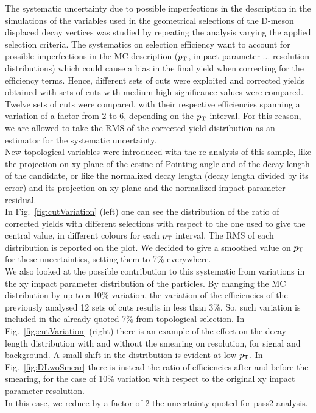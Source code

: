 The systematic uncertainty due to possible imperfections
 in the description in the simulations
of the variables used in the geometrical selections of the 
D-meson displaced decay vertices was
studied by repeating the analysis varying the applied selection criteria.
The systematics on selection efficiency want to account for 
possible imperfections in the MC description ($p_{\rm T}$, 
impact parameter ... resolution distributions) which could 
cause a bias in the final yield when correcting for the efficiency terms.
Hence, different sets of cuts were exploited and corrected 
yields obtained with sets of cuts with medium-high significance 
values were compared. Twelve sets of cuts were compared, 
with their respective efficiencies spanning a variation of
a factor from 2 to 6, depending on the $p_{\rm T}$ interval. For this 
reason, we are allowed to take the RMS of the corrected yield distribution as 
an estimator for the systematic uncertainty. \\New topological 
variables were introduced with the re-analysis of this
sample, like the projection on xy plane of the cosine of Pointing 
angle and of the decay length of the candidate, or like
the normalized decay length (decay length divided by its error) 
and its projection on xy plane and the normalized impact parameter
residual. \\In Fig.~\ref{fig:cutVariation} (left) one can see the 
distribution of the ratio of corrected yields with different selections with respect to the one
used to give the central value, in different colours for each 
$p_{\rm T}$ interval. The RMS of each distribution is reported on the plot. 
We decided to give a smoothed value on $p_{\rm T}$ for these uncertainties, 
setting them to 7\% everywhere.\\
We also looked at the possible contribution to this systematic from
 variations in the xy impact parameter distribution 
of the particles. By changing the MC distribution by up to a 10\% 
variation, the variation of the efficiencies
of the previously analysed 12 sets of cuts results in less than 3\%. 
So, such variation is included in the already quoted 7\% from topological
selection. In Fig.~\ref{fig:cutVariation} (right) there is an example of the 
effect on the decay length distribution with and without the smearing on
resolution, for signal and background. A small shift in the distribution 
is evident at low $p_{\rm T}$. In Fig.~\ref{fig:DLwoSmear} there is instead the ratio
of efficiencies after and before the smearing, for the case of 10\% 
variation with respect to the original xy impact parameter resolution.\\
In this case, we reduce by a factor of 2 the uncertainty quoted for pass2 analysis.

